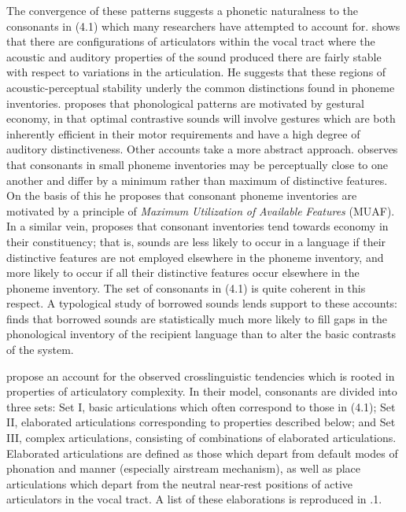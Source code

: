   The convergence of these patterns suggests a phonetic naturalness to the consonants in (4.1) which many researchers have attempted to account for. \citet{Stevens1989} shows that there are configurations of articulators within the vocal tract where the acoustic and auditory properties of the sound produced there are fairly stable with respect to variations in the articulation. He suggests that these regions of acoustic-perceptual stability underly the common distinctions found in phoneme inventories. \citet{Maddieson1996} proposes that phonological patterns are motivated by gestural economy, in that optimal contrastive sounds will involve gestures which are both inherently efficient in their motor requirements and have a high degree of auditory distinctiveness. Other accounts take a more abstract approach. \citet{Ohala1979} observes that consonants in small phoneme inventories may be perceptually close to one another and differ by a minimum rather than maximum of distinctive features. On the basis of this he proposes that consonant phoneme inventories are motivated by a principle of \textit{Maximum} \textit{Utilization} \textit{of} \textit{Available} \textit{Features} (MUAF). In a similar vein, \citet{Clements2003} proposes that consonant inventories tend towards economy in their constituency; that is, sounds are less likely to occur in a language if their distinctive features are not employed elsewhere in the phoneme inventory, and more likely to occur if all their distinctive features occur elsewhere in the phoneme inventory. The set of consonants in (4.1) is quite coherent in this respect. A typological study of borrowed sounds lends support to these accounts: \citet{Maddieson1985} finds that borrowed sounds are statistically much more likely to fill gaps in the phonological inventory of the recipient language than to alter the basic contrasts of the system.



  \citet{LindblomMaddieson1988} propose an account for the observed crosslinguistic tendencies which is rooted in properties of articulatory complexity. In their model, consonants are divided into three sets: Set I, basic articulations which often correspond to those in (4.1); Set II, elaborated articulations corresponding to properties described below; and Set III, complex articulations, consisting of combinations of elaborated articulations. Elaborated articulations are defined as those which depart from default modes of phonation and manner (especially airstream mechanism), as well as place articulations which depart from the neutral near-rest positions of active articulators in the vocal tract. A list of these elaborations is reproduced in .1.






